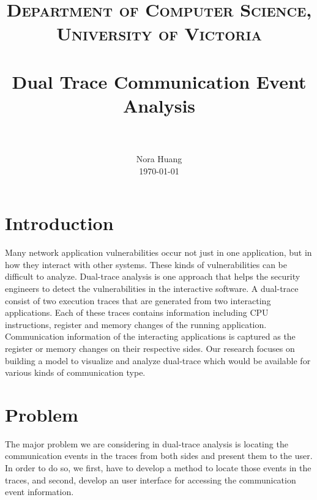\documentclass[paper=a4, fontsize=11pt]{scrartcl}
\title{
		\usefont{OT1}{bch}{b}{n}
		\normalfont \normalsize \textsc{Department of Computer Science,  University of Victoria} \\ [25pt]
		\horrule{0.5pt} \\[0.4cm]
		\huge Dual Trace Communication Event Analysis  \\
		\horrule{2pt} \\[0.5cm]
}
\author{
		\normalfont 								\normalsize
        Nora Huang\\[-3pt]		\normalsize
        \today
}
\date{}
\numberwithin{equation}{section}		%
\numberwithin{figure}{section}			%
\numberwithin{table}{section}				%
\begin{document}
\maketitle

\section{Introduction}

Many network application vulnerabilities occur not just in one application, but in how they interact with other systems. These kinds of vulnerabilities can be difficult to analyze. Dual-trace analysis is one approach that helps the security engineers to detect the vulnerabilities in the interactive software. A dual-trace consist of two execution traces that are generated from two interacting applications. Each of these traces contains information including CPU instructions, register and memory changes of the running application. Communication information of the interacting applications is captured as the register or memory changes on their respective sides. Our research focuses on building a model to visualize and analyze dual-trace which would be available for various kinds of communication type.

\section{Problem}
The major problem we are considering in dual-trace analysis is locating the communication events in the traces from both sides and present them to the user. In order to do so,  we first, have to develop a method to locate those events in the traces, and second, develop an user interface for accessing the communication event information.\par
\end{document}
